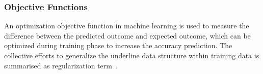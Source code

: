 \subsubsection{Objective Functions}
An optimization objective function in machine learning is used to measure the difference between the predicted outcome and expected outcome, which can be optimized during training phase to increase the accuracy prediction. The collective efforts to generalize the underline data structure within training data is summarised as regularization term~\cite{goodfellow_2015}.  